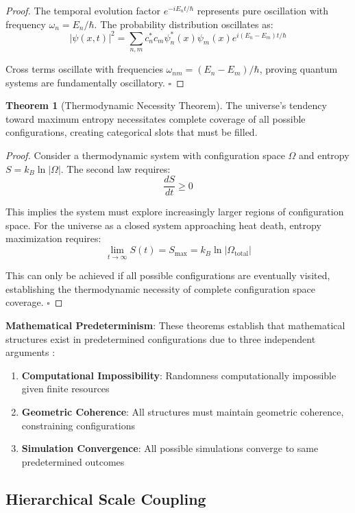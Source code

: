 \documentclass[12pt,a4paper]{article}
\theoremstyle{definition}
\newtheorem{theorem}{Theorem}[section]
\begin{document}
{\begin{proof}
The temporal evolution factor $e^{-iE_n t/\hbar}$ represents pure oscillation with frequency $\omega_n = E_n/\hbar$. The probability distribution oscillates as:
$$|\psi(x,t)|^2 = \sum_{n,m} c_n^* c_m \psi_n^*(x) \psi_m(x) e^{i(E_n - E_m)t/\hbar}$$

Cross terms oscillate with frequencies $\omega_{nm} = (E_n - E_m)/\hbar$, proving quantum systems are fundamentally oscillatory. $\square$
\end{proof}

\begin{theorem}[Thermodynamic Necessity Theorem]
The universe's tendency toward maximum entropy necessitates complete coverage of all possible configurations, creating categorical slots that must be filled.
\end{theorem}

\begin{proof}
Consider a thermodynamic system with configuration space $\Omega$ and entropy $S = k_B \ln|\Omega|$. The second law requires:
$$\frac{dS}{dt} \geq 0$$

This implies the system must explore increasingly larger regions of configuration space. For the universe as a closed system approaching heat death, entropy maximization requires:
$$\lim_{t \to \infty} S(t) = S_{\max} = k_B \ln|\Omega_{\text{total}}|$$

This can only be achieved if all possible configurations are eventually visited, establishing the thermodynamic necessity of complete configuration space coverage. $\square$
\end{proof}

\textbf{Mathematical Predeterminism}: These theorems establish that mathematical structures exist in predetermined configurations due to three independent arguments \cite{sachikonye2024predeterminism}:

\begin{enumerate}
\item \textbf{Computational Impossibility}: Randomness computationally impossible given finite resources
\item \textbf{Geometric Coherence}: All structures must maintain geometric coherence, constraining configurations
\item \textbf{Simulation Convergence}: All possible simulations converge to same predetermined outcomes
\end{enumerate}

\subsection{Hierarchical Scale Coupling}

}
\end{document}

